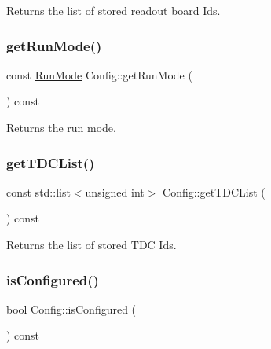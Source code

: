 Returns the list of stored readout board Ids. 

\mbox{\label{class_config_a1e69242b7f57068005d5ae195ca16530}} 
\subsubsection{\texorpdfstring{get\+Run\+Mode()}{getRunMode()}}
{\footnotesize\ttfamily const \hyperlink{_modes_enum_8hpp_a3dfe11cf1a3a8121f6cd7fec4bf5947e}{Run\+Mode} Config\+::get\+Run\+Mode (\begin{DoxyParamCaption}{ }\end{DoxyParamCaption}) const\hspace{0.3cm}{\ttfamily [inline]}}



Returns the run mode. 

\mbox{\label{class_config_a847bc1cf36b3d12da8590a036634a150}} 
\subsubsection{\texorpdfstring{get\+T\+D\+C\+List()}{getTDCList()}}
{\footnotesize\ttfamily const std\+::list$<$unsigned int$>$ Config\+::get\+T\+D\+C\+List (\begin{DoxyParamCaption}{ }\end{DoxyParamCaption}) const\hspace{0.3cm}{\ttfamily [inline]}}



Returns the list of stored T\+DC Ids. 

\mbox{\label{class_config_a47870f3f5bc52f5d0aa387c25e431055}} 
\subsubsection{\texorpdfstring{is\+Configured()}{isConfigured()}}
{\footnotesize\ttfamily bool Config\+::is\+Configured (\begin{DoxyParamCaption}{ }\end{DoxyParamCaption}) const\hspace{0.3cm}{\ttfamily [inline]}}



